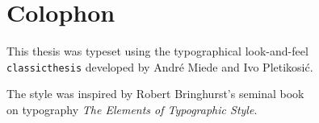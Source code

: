 \thispagestyle{plain}

\hfill

\vfill


\section*{Colophon}
\noindent This thesis was typeset using the typographical look-and-feel\\
\texttt{classicthesis} developed by André Miede and Ivo Pletikosić.\bigskip

\noindent The style was inspired by Robert Bringhurst's seminal book\\
on typography \emph{The Elements of Typographic Style}.\bigskip


